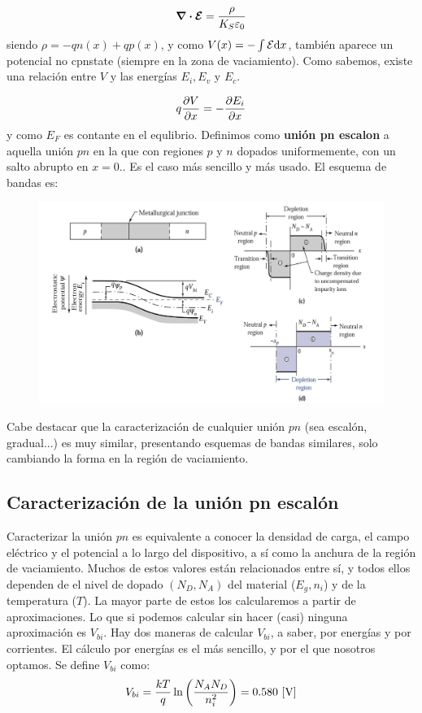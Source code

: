 \begin{equation}
    \div \boldsymbol{\mathcal{E}} = \frac{\rho}{K_S \varepsilon_0}
\end{equation}
siendo $\rho=-qn(x)+qp(x)$, y como $V(x)=-\int \mathcal{E} \mathrm{d} x$, también aparece un potencial no cpnstate (siempre en la zona de vaciamiento). Como sabemos, existe una relación entre $V$ y las energías $E_i,E_v$ y $E_c$. 

\begin{equation*}
    q \frac{\partial V}{\partial x} = - \frac{\partial E_i}{\partial x}
\end{equation*}
y como $E_F$ es contante en el equlibrio. Definimos como \textbf{unión pn escalon} a aquella unión $pn$ en la que con regiones $p$ y $n$ dopados uniformemente, con un salto abrupto en $x=0$.. Es el caso más sencillo y más usado. El esquema de bandas es:

\begin{figure}[h!] \centering
    \includegraphics[width=0.9\linewidth]{Cuerpo/Ch_03/03_Temario_01.png}
\end{figure}

Cabe destacar que la caracterización de cualquier unión $pn$ (sea escalón, gradual...) es muy similar, presentando esquemas de bandas similares, solo cambiando la forma en la región de vaciamiento.


\subsection{Caracterización de la unión pn escalón}
Caracterizar la unión $pn$ es equivalente a conocer la densidad de carga, el campo eléctrico y el potencial a lo largo del dispositivo, a sí como la anchura de la región de vaciamiento. Muchos de estos valores están relacionados entre sí, y todos ellos dependen de el nivel de dopado $(N_D,N_A)$ del material ($E_g,n_i$) y de la temperatura ($T$). La mayor parte de estos los calcularemos a partir de aproximaciones. Lo que si podemos calcular sin hacer (casi) ninguna aproximación es $V_{bi}$. Hay dos maneras de calcular $V_{bi}$, a saber, por energías y por corrientes. El cálculo por energías es el más sencillo, y por el que nosotros optamos. Se define $V_{bi}$ como:
\begin{equation}
    V_{bi} = \frac{kT}{q} \ln \parentesis{\frac{N_AN_D}{n_i^2}} = 0.580 \ [\unit{V}]
\end{equation}

